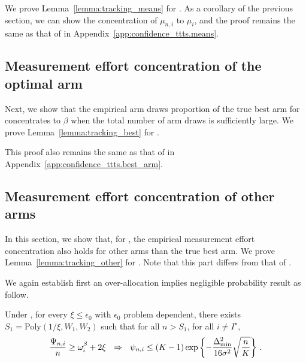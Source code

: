 We prove Lemma~\ref{lemma:tracking_means} for \TCC. As a corollary of the previous section, we can show the concentration of $\mu_{n,i}$ to $\mu_i$, and the proof remains the same as that of \TTTS in Appendix~\ref{app:confidence_ttts.means}.

\subsection{Measurement effort concentration of the optimal arm}\label{app:confidence_t3c.best_arm}

Next, we show that the empirical arm draws proportion of the true best arm for \TCC concentrates to $\beta$ when the total number of arm draws is sufficiently large. We prove Lemma~\ref{lemma:tracking_best} for \TCC.

This proof also remains the same as that of \TTTS in Appendix~\ref{app:confidence_ttts.best_arm}.

\subsection{Measurement effort concentration of other arms}\label{app:confidence_t3c.other_arms}

In this section, we show that, for \TCC, the empirical measurement effort concentration also holds for other arms than the true best arm. We prove Lemma~\ref{lemma:tracking_other} for \TCC. Note that this part differs from that of \TTTS.

We again establish first an over-allocation implies negligible probability result as follow.

\begin{lemma}\label{lemma:over_allocation_finite_t3c} 
    Under \TCC, for every $\xi \leq \epsilon_0$ with $\epsilon_0$ problem dependent, there exists $S_1 = \text{Poly}(1/\xi,W_1,W_2)$ such that for all $n > S_1$, for all $i\neq I^\star$, 
    \[
        \frac{\Psi_{n,i}}{n} \geq \omega_{i}^\beta + 2\xi  \ \ \Rightarrow \ \ \psi_{n,i} \leq (K-1)\exp\left\{-\frac{\Delta_{\text{min}}^2}{16\sigma^2}\sqrt{\frac{n}{K}}\right\}\,.
    \]
\end{lemma}

